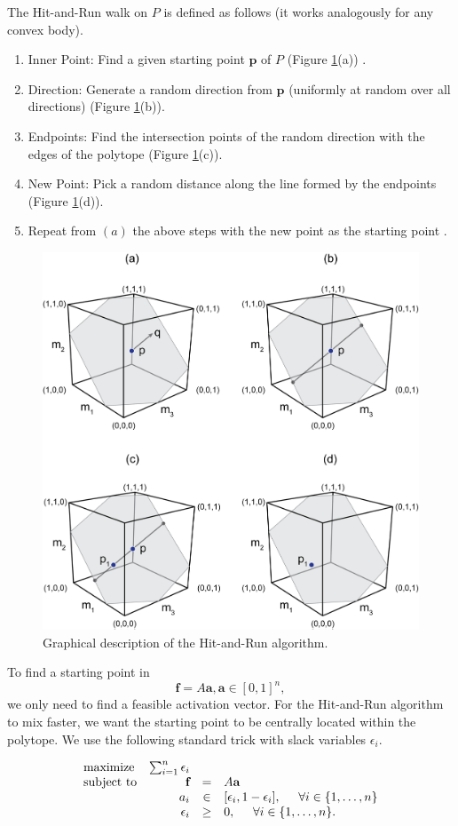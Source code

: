The Hit-and-Run walk on $P$ is defined as follows (it works analogously for any convex body). 
\begin{enumerate}
\item Inner Point: Find a given starting point $\textbf{p}$ of $P$ (Figure \ref{fig:hitruncube}(a)) .
\item Direction: Generate a random direction from $\textbf{p}$ (uniformly at random over all directions) (Figure \ref{fig:hitruncube}(b)).
\item Endpoints: Find the intersection points of the random direction with the edges of the polytope (Figure \ref{fig:hitruncube}(c)).
\item New Point: Pick a random distance along the line formed by the endpoints (Figure \ref{fig:hitruncube}(d)). 
\item Repeat from $(a)$ the above steps with the new point as the starting point .
\end{enumerate}


\begin{figure}[htbp]
\centering
\includegraphics[width=7.5cm\textwidth]{sections/figs/hitruncube.png}
\caption{Graphical description of the Hit-and-Run algorithm.}
\label{fig:hitruncube}
\end{figure}


To find a starting point in 
\[\textbf{f} = A\textbf{a}, \textbf{a} \in [0,1]^n,\]
we only need to find a feasible activation vector. For the Hit-and-Run algorithm to mix faster, we want the starting point to be centrally located within the polytope. We use the following standard trick with slack variables $\epsilon_i$.

\begin{equation}\label{eq:LP_r}
\begin{array}{lrcl}
\mbox{maximize} & \sum_{i=1}^n \epsilon_i \\ 
\mbox{subject to} & \textbf{f} &=& A\textbf{a}\\
  & a_i &\in& [\epsilon_i, 1- \epsilon_i], \hspace{5mm} \forall i \in \{1,\dots,n\}  \\
  & \epsilon_i &\geq& 0, \hspace{5mm} \forall i \in \{1,\dots,n\}.  
\end{array}
\end{equation}

